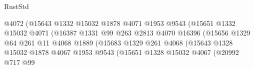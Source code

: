 \begin{lexlean}{RustStd}
\begin{coremodule}
                                              @4072
                                              (@15643
                                                @1332
                                                @15032
                                                @1878
                                                @4071
                                                @1953
                                                @9543
                                                (@15651
                                                  @1332
                                                  @15032
                                                  @4071
                                                  (@16387
                                                    @1331
                                                    @99
                                                    @263
                                                    @2813
                                                    @4070
                                                    @16396
                                                    (@15656
                                                      @1329
                                                      @64
                                                      @261
                                                      @11
                                                      @4068
                                                      @1889
                                                      (@15683
                                                        @1329
                                                        @261
                                                        @4068
                                                        (@15643
                                                          @1328
                                                          @15032
                                                          @1878
                                                          @4067
                                                          @1953
                                                          @9543
                                                          (@15651
                                                            @1328
                                                            @15032
                                                            @4067
                                                            (@20992
                                                              @717
                                                              @99

\end{coremodule}
\end{lexlean}
